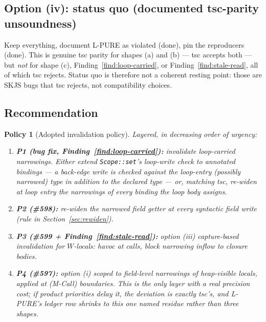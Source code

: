 \documentclass[11pt]{article}
\newtheorem{policy}[theorem]{Policy}
\begin{document}
\subsection{Option (iv): status quo (documented tsc-parity unsoundness)}
Keep everything, document L-PURE as violated (done), pin the
reproducers (done). This is genuine tsc parity for shapes (a) and (b) —
tsc accepts both — but \emph{not} for shape (c),
Finding~\ref{find:loop-carried}, or Finding~\ref{find:stale-read}, all
of which tsc rejects. Status quo is therefore not a coherent resting
point: those are SKJS bugs that tsc rejects, not compatibility choices.

\subsection{Recommendation}
\label{sec:recommend}

\begin{policy}[Adopted invalidation policy]
\label{pol:main}
Layered, in decreasing order of urgency:
\begin{enumerate}
\item \textbf{P1 (bug fix, Finding~\ref{find:loop-carried}):} invalidate
  loop-carried narrowings. Either extend \texttt{Scope::set}'s
  loop-write check to annotated bindings — a back-edge write is
  checked against the loop-entry (possibly narrowed) type \emph{in
  addition to} the declared type — or, matching tsc, re-widen at loop
  entry the narrowings of every binding the loop body assigns.
\item \textbf{P2 (\#598):} re-widen the narrowed field getter at every
  syntactic field write (rule in Section~\ref{sec:rewiden}).
\item \textbf{P3 (\#599 + Finding~\ref{find:stale-read}):} option (iii)
  capture-based invalidation for $W$-locals: havoc at calls, block
  narrowing inflow to closure bodies.
\item \textbf{P4 (\#597):} option (i) scoped to field-level narrowings of
  heap-visible locals, applied at (M-Call) boundaries. This is the only
  layer with a real precision cost; if product priorities delay it, the
  deviation is exactly tsc's, and L-PURE's ledger row shrinks to this one
  named residue rather than three shapes.
\end{enumerate}
\end{policy}
\end{document}
